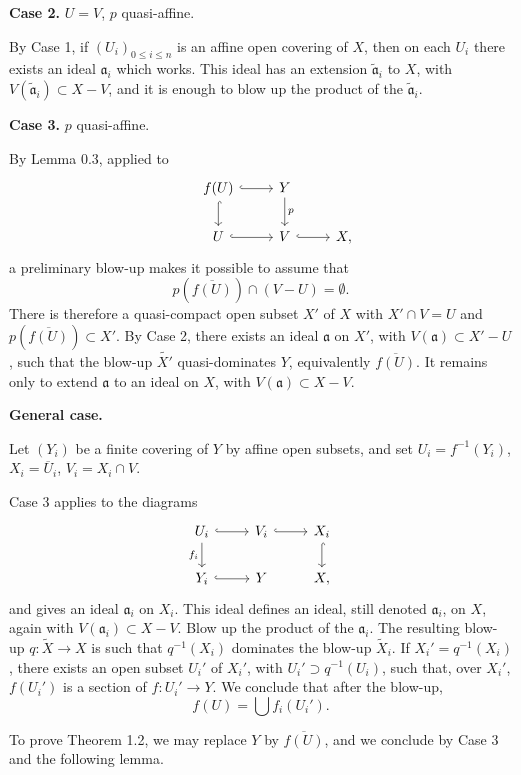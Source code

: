 \documentclass[11pt,a4paper]{article}
\theoremstyle{plain}
\theoremstyle{definition}
\begin{document}
\smallskip
\noindent\textbf{Case 2.} $U=V$, $p$ quasi-affine.

By Case 1, if $(U_i)_{0\le i\le n}$ is an affine open covering of $X$, then on each $U_i$ there exists an ideal $\mathfrak a_i$ which works. This ideal has an extension $\widetilde{\mathfrak a}_i$ to $X$, with $V(\widetilde{\mathfrak a}_i)\subset X-V$, and it is enough to blow up the product of the $\widetilde{\mathfrak a}_i$.

\smallskip
\noindent\textbf{Case 3.} $p$ quasi-affine.

By Lemma 0.3, applied to
\[
\begin{tikzcd}
& f(U) \arrow[d,hook] \arrow[r,hook] & Y \arrow[d,"p"] \\
& U \arrow[r,hook] & V \arrow[r,hook] & X,
\end{tikzcd}
\]
a preliminary blow-up makes it possible to assume that
\[
p(\overline{f(U)})\cap (V-U)=\emptyset.
\]
There is therefore a quasi-compact open subset $X'$ of $X$ with $X'\cap V=U$ and $p(\overline{f(U)})\subset X'$. By Case 2, there exists an ideal $\mathfrak a$ on $X'$, with $V(\mathfrak a)\subset X'-U$, such that the blow-up $\widetilde{X'}$ quasi-dominates $Y$, equivalently $\overline{f(U)}$. It remains only to extend $\mathfrak a$ to an ideal on $X$, with $V(\mathfrak a)\subset X-V$.

\smallskip
\noindent\textbf{General case.}

Let $(Y_i)$ be a finite covering of $Y$ by affine open subsets, and set $U_i=f^{-1}(Y_i)$, $X_i=\overline U_i$, $V_i=X_i\cap V$.

Case 3 applies to the diagrams
\[
\begin{tikzcd}
U_i \arrow[r,hook] \arrow[d,"f_i"'] & V_i \arrow[r,hook] & X_i \arrow[d,hook] \\
Y_i \arrow[r,hook] & Y & X,
\end{tikzcd}
\]
and gives an ideal $\mathfrak a_i$ on $X_i$. This ideal defines an ideal, still denoted $\mathfrak a_i$, on $X$, again with $V(\mathfrak a_i)\subset X-V$. Blow up the product of the $\mathfrak a_i$. The resulting blow-up $q:\widetilde X\to X$ is such that $q^{-1}(X_i)$ dominates the blow-up $\widetilde X_i$. If $X_i'=q^{-1}(X_i)$, there exists an open subset $U_i'$ of $X_i'$, with $U_i'\supset q^{-1}(U_i)$, such that, over $X_i'$, $f(U_i')$ is a section of $f:U_i'\to Y$. We conclude that after the blow-up,
\[
f(U)=\bigcup f_i(U_i').
\]

To prove Theorem 1.2, we may replace $Y$ by $\overline{f(U)}$, and we conclude by Case 3 and the following lemma.
\end{document}
